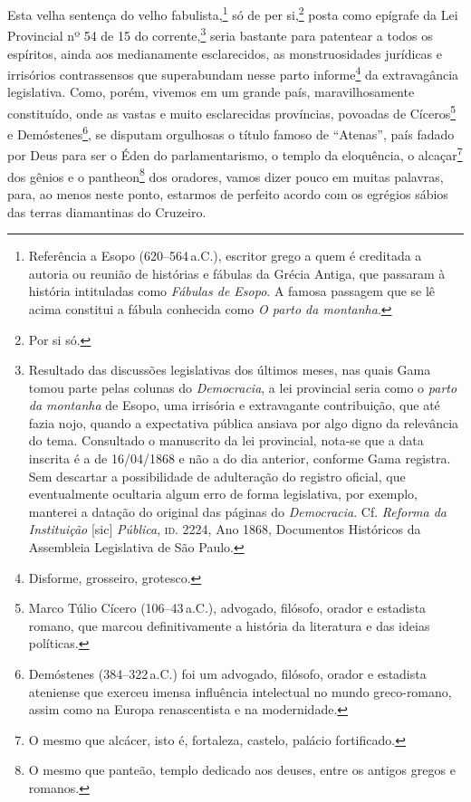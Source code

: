 Esta velha sentença do velho fabulista,\footnote{Referência a Esopo
  (620--564\,a.C.), escritor grego a quem é creditada a autoria ou reunião
  de histórias e fábulas da Grécia Antiga, que passaram à história
  intituladas como \emph{Fábulas de Esopo}. A famosa passagem que se lê
  acima constitui a fábula conhecida como \emph{O parto da montanha}.}
só de per si,\footnote{Por si só.} posta como epígrafe da Lei
Provincial nº 54 de 15 do corrente,\footnote{Resultado das discussões
  legislativas dos últimos meses, nas quais Gama tomou parte pelas
  colunas do \emph{Democracia}, a lei provincial seria como o
  \emph{parto da montanha} de Esopo, uma irrisória e extravagante
  contribuição, que até fazia nojo, quando a expectativa pública ansiava
  por algo digno da relevância do tema. Consultado o manuscrito da lei
  provincial, nota-se que a data inscrita é a de 16/04/1868 e não a do
  dia anterior, conforme Gama registra. Sem descartar a possibilidade de
  adulteração do registro oficial, que eventualmente ocultaria algum
  erro de forma legislativa, por exemplo, manterei a datação do original
  das páginas do \emph{Democracia}. Cf. \emph{Reforma da Instituição}
  {[}sic{]} \emph{Pública}, \textsc{id}. 2224, Ano 1868, Documentos Históricos da
  Assembleia Legislativa de São Paulo.} seria bastante para patentear a
todos os espíritos, ainda aos medianamente esclarecidos, as
monstruosidades jurídicas e irrisórios contrassensos que superabundam
nesse parto informe\footnote{Disforme, grosseiro, grotesco.} da
extravagância legislativa. Como, porém, vivemos em um grande país,
maravilhosamente constituído, onde as vastas e muito esclarecidas
províncias, povoadas de Cíceros\footnote{Marco Túlio Cícero (106--43\,a.C.), 
advogado, filósofo, orador e estadista romano, que
  marcou definitivamente a história da literatura e das ideias
  políticas.} e Demóstenes\footnote{Demóstenes (384--322\,a.C.) foi
  um advogado, filósofo, orador e estadista ateniense que exerceu imensa
  influência intelectual no mundo greco-romano, assim como na Europa
  renascentista e na modernidade.}, se disputam orgulhosas o título
famoso de ``Atenas'', país fadado por Deus para ser o Éden do
parlamentarismo, o templo da eloquência, o alcaçar\footnote{O mesmo
  que alcácer, isto é, fortaleza, castelo, palácio fortificado.} dos
gênios e o pantheon\footnote{O mesmo que panteão, templo dedicado aos
  deuses, entre os antigos gregos e romanos.} dos oradores, vamos dizer
pouco em muitas palavras, para, ao menos neste ponto, estarmos de
perfeito acordo com os egrégios sábios das terras diamantinas do
Cruzeiro.

